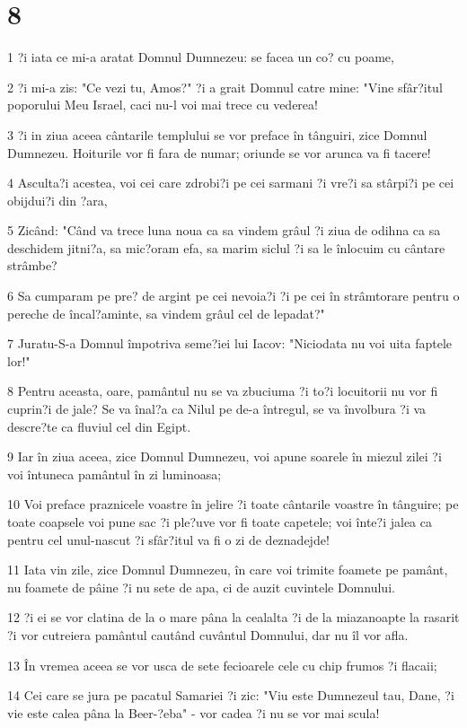 \chapter{8}

\par 1 ?i iata ce mi-a aratat Domnul Dumnezeu: se facea un co? cu poame,
\par 2 ?i mi-a zis: "Ce vezi tu, Amos?" ?i a grait Domnul catre mine: "Vine sfâr?itul poporului Meu Israel, caci nu-l voi mai trece cu vederea!
\par 3 ?i in ziua aceea cântarile templului se vor preface în tânguiri, zice Domnul Dumnezeu. Hoiturile vor fi fara de numar; oriunde se vor arunca va fi tacere!
\par 4 Asculta?i acestea, voi cei care zdrobi?i pe cei sarmani ?i vre?i sa stârpi?i pe cei obijdui?i din ?ara,
\par 5 Zicând: "Când va trece luna noua ca sa vindem grâul ?i ziua de odihna ca sa deschidem jitni?a, sa mic?oram efa, sa marim siclul ?i sa le înlocuim cu cântare strâmbe?
\par 6 Sa cumparam pe pre? de argint pe cei nevoia?i ?i pe cei în strâmtorare pentru o pereche de încal?aminte, sa vindem grâul cel de lepadat?"
\par 7 Juratu-S-a Domnul împotriva seme?iei lui Iacov: "Niciodata nu voi uita faptele lor!"
\par 8 Pentru aceasta, oare, pamântul nu se va zbuciuma ?i to?i locuitorii nu vor fi cuprin?i de jale? Se va înal?a ca Nilul pe de-a întregul, se va învolbura ?i va descre?te ca fluviul cel din Egipt.
\par 9 Iar în ziua aceea, zice Domnul Dumnezeu, voi apune soarele în miezul zilei ?i voi întuneca pamântul în zi luminoasa;
\par 10 Voi preface praznicele voastre în jelire ?i toate cântarile voastre în tânguire; pe toate coapsele voi pune sac ?i ple?uve vor fi toate capetele; voi înte?i jalea ca pentru cel unul-nascut ?i sfâr?itul va fi o zi de deznadejde!
\par 11 Iata vin zile, zice Domnul Dumnezeu, în care voi trimite foamete pe pamânt, nu foamete de pâine ?i nu sete de apa, ci de auzit cuvintele Domnului.
\par 12 ?i ei se vor clatina de la o mare pâna la cealalta ?i de la miazanoapte la rasarit ?i vor cutreiera pamântul cautând cuvântul Domnului, dar nu îl vor afla.
\par 13 În vremea aceea se vor usca de sete fecioarele cele cu chip frumos ?i flacaii;
\par 14 Cei care se jura pe pacatul Samariei ?i zic: "Viu este Dumnezeul tau, Dane, ?i vie este calea pâna la Beer-?eba" - vor cadea ?i nu se vor mai scula!

